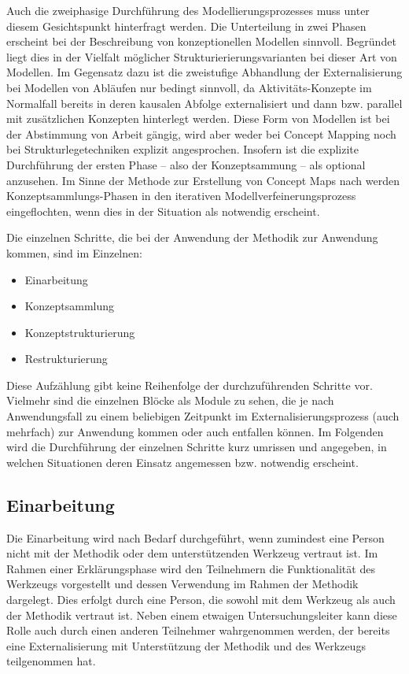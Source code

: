 Auch die zweiphasige Durchführung des Modellierungsprozesses muss unter diesem Gesichtspunkt hinterfragt werden. Die Unterteilung in zwei Phasen erscheint bei der Beschreibung von konzeptionellen Modellen sinnvoll. Begründet liegt dies in der Vielfalt möglicher Strukturierierungsvarianten bei dieser Art von Modellen. Im Gegensatz dazu ist die zweistufige Abhandlung der Externalisierung bei Modellen von Abläufen nur bedingt sinnvoll, da Aktivitäts-Konzepte im Normalfall bereits in deren kausalen Abfolge externalisiert und dann bzw. parallel mit zusätzlichen Konzepten hinterlegt werden. Diese Form von Modellen ist bei der Abstimmung von Arbeit gängig, wird aber weder bei Concept Mapping noch bei Strukturlegetechniken explizit angesprochen. Insofern ist die explizite Durchführung der ersten Phase -- also der Konzeptsammung -- als optional anzusehen. Im Sinne der Methode zur Erstellung von Concept Maps nach \citep{Novak06} werden Konzeptsammlungs-Phasen in den iterativen Modellverfeinerungsprozess eingeflochten, wenn dies in der Situation als notwendig erscheint.

Die einzelnen Schritte, die bei der Anwendung der Methodik zur Anwendung kommen, sind im Einzelnen:
\begin{itemize}
 \item Einarbeitung
 \item Konzeptsammlung 
 \item Konzeptstrukturierung
 \item Restrukturierung
\end{itemize}

Diese Aufzählung gibt keine Reihenfolge der durchzuführenden Schritte vor. Vielmehr sind die einzelnen Blöcke als Module zu sehen, die je nach Anwendungsfall zu einem beliebigen Zeitpunkt im Externalisierungsprozess (auch mehrfach) zur Anwendung kommen oder auch entfallen können. Im Folgenden wird die Durchführung der einzelnen Schritte kurz umrissen und angegeben, in welchen Situationen deren Einsatz angemessen bzw. notwendig erscheint.

\subsection{Einarbeitung}

Die Einarbeitung wird nach Bedarf durchgeführt, wenn zumindest eine Person nicht mit der Methodik oder dem unterstützenden Werkzeug vertraut ist. Im Rahmen einer Erklärungsphase wird den Teilnehmern die Funktionalität des Werkzeugs vorgestellt und dessen Verwendung im Rahmen der Methodik dargelegt. Dies erfolgt durch eine Person, die sowohl mit dem Werkzeug als auch der Methodik vertraut ist. Neben einem etwaigen Untersuchungsleiter kann diese Rolle auch durch einen anderen Teilnehmer wahrgenommen werden, der bereits eine Externalisierung mit Unterstützung der Methodik und des Werkzeugs teilgenommen hat.

